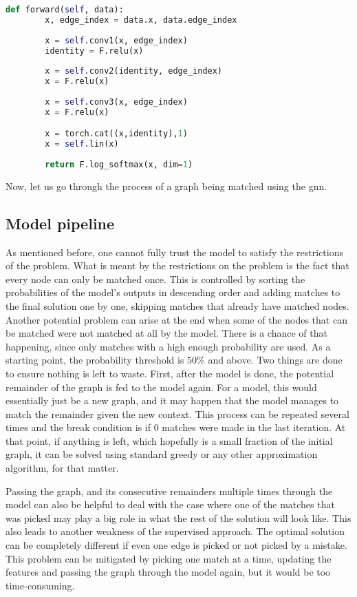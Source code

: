\begin{lstlisting}[caption={Skip connection example}, label={Skip connection example}, language=Python]
def forward(self, data):        
        x, edge_index = data.x, data.edge_index
        
        x = self.conv1(x, edge_index)
        identity = F.relu(x)
        
        x = self.conv2(identity, edge_index)
        x = F.relu(x)
        
        x = self.conv3(x, edge_index)
        x = F.relu(x)

        x = torch.cat((x,identity),1)
        x = self.lin(x)
        
        return F.log_softmax(x, dim=1)
\end{lstlisting}

Now, let us go through the process of a graph being matched using the \gls{gnn}.

\subsection{Model pipeline}

As mentioned before, one cannot fully trust the model to satisfy the restrictions of the problem. What is meant by the restrictions on the problem is the fact that every node can only be matched once. This is controlled by sorting the probabilities of the model's outputs in descending order and adding matches to the final solution one by one, skipping matches that already have matched nodes. Another potential problem can arise at the end when some of the nodes that can be matched were not matched at all by the model. There is a chance of that happening, since only matches with a high enough probability are used. As a starting point, the probability threshold is 50\% and above. Two things are done to ensure nothing is left to waste. First, after the model is done, the potential remainder of the graph is fed to the model again. For a model, this would essentially just be a new graph, and it may happen that the model manages to match the remainder given the new context. This process can be repeated several times and the break condition is if 0 matches were made in the last iteration. At that point, if anything is left, which hopefully is a small fraction of the initial graph, it can be solved using standard greedy or any other approximation algorithm, for that matter.

Passing the graph, and its consecutive remainders multiple times through the model can also be helpful to deal with the case where one of the matches that was picked may play a big role in what the rest of the solution will look like. This also leads to another weakness of the supervised approach. The optimal solution can be completely different if even one edge is picked or not picked by a mistake. This problem can be mitigated by picking one match at a time, updating the features and passing the graph through the model again, but it would be too time-consuming.


